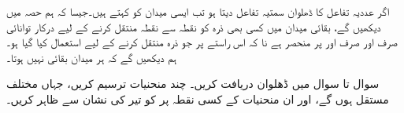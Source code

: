 اگر عددیہ تفاعل کا ڈھلوان سمتیہ  تفاعل دیتا ہو تب ایسی میدان کو  کہتے ہیں۔جیسا کہ ہم  حصہ  میں دیکھیں گے، بقائی میدان میں کسی بھی ذرہ کو نقطہ  سے نقطہ  منتقل کرنے کے لیے درکار توانائی صرف اور صرف  اور  پر منحصر ہے نا کہ اس راستے پر جو ذرہ منتقل کرنے کے لیے استعمال کیا گیا ہو۔ہم دیکھیں گے کہ ہر میدان بقائی نہیں ہوتا۔

سوال  تا سوال  میں ڈھلوان  دریافت کریں۔ چند  منحنیات  ترسیم کریں، جہاں  مختلف مستقل ہوں گے،  اور ان منحنیات  کے کسی نقطہ پر  کو تیر کی نشان سے ظاہر کریں۔

